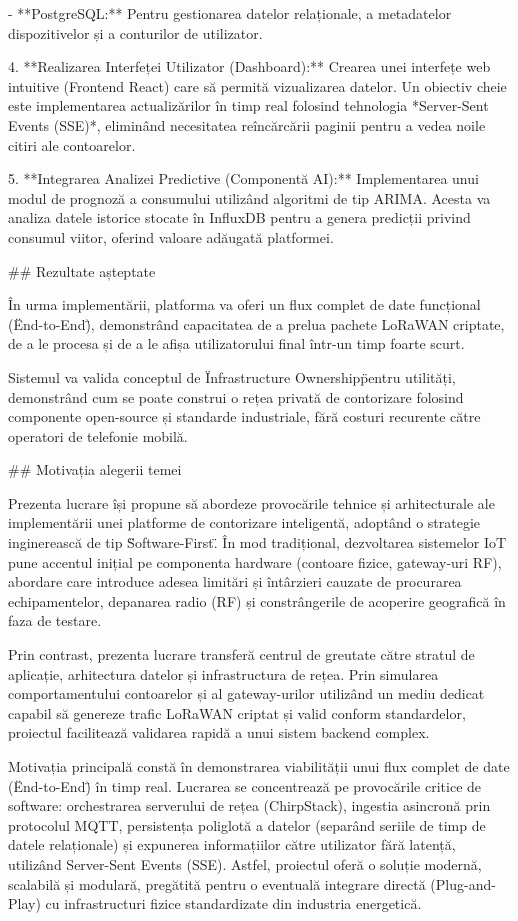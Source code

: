     - **PostgreSQL:** Pentru gestionarea datelor relaționale, a
      metadatelor dispozitivelor și a conturilor de utilizator.

4.  **Realizarea Interfeței Utilizator (Dashboard):** Crearea unei
    interfețe web intuitive (Frontend React) care să permită
    vizualizarea datelor. Un obiectiv cheie este implementarea
    actualizărilor în timp real folosind tehnologia *Server-Sent Events
    (SSE)*, eliminând necesitatea reîncărcării paginii pentru a vedea
    noile citiri ale contoarelor.

5.  **Integrarea Analizei Predictive (Componentă AI):** Implementarea
    unui modul de prognoză a consumului utilizând algoritmi de tip
    ARIMA. Acesta va analiza datele istorice stocate în InfluxDB pentru
    a genera predicții privind consumul viitor, oferind valoare adăugată
    platformei.

## Rezultate așteptate

În urma implementării, platforma va oferi un flux complet de date
funcțional (\"End-to-End\"), demonstrând capacitatea de a prelua pachete
LoRaWAN criptate, de a le procesa și de a le afișa utilizatorului final
într-un timp foarte scurt.

Sistemul va valida conceptul de \"Infrastructure Ownership\" pentru
utilități, demonstrând cum se poate construi o rețea privată de
contorizare folosind componente open-source și standarde industriale,
fără costuri recurente către operatori de telefonie mobilă.

## Motivația alegerii temei

Prezenta lucrare își propune să abordeze provocările tehnice și
arhitecturale ale implementării unei platforme de contorizare
inteligentă, adoptând o strategie inginerească de tip
\"Software-First\". În mod tradițional, dezvoltarea sistemelor IoT pune
accentul inițial pe componenta hardware (contoare fizice, gateway-uri
RF), abordare care introduce adesea limitări și întârzieri cauzate de
procurarea echipamentelor, depanarea radio (RF) și constrângerile de
acoperire geografică în faza de testare.

Prin contrast, prezenta lucrare transferă centrul de greutate către
stratul de aplicație, arhitectura datelor și infrastructura de rețea.
Prin simularea comportamentului contoarelor și al gateway-urilor
utilizând un mediu dedicat capabil să genereze trafic LoRaWAN criptat și
valid conform standardelor, proiectul facilitează validarea rapidă a
unui sistem backend complex.

Motivația principală constă în demonstrarea viabilității unui flux
complet de date (\"End-to-End\") în timp real. Lucrarea se concentrează
pe provocările critice de software: orchestrarea serverului de rețea
(ChirpStack), ingestia asincronă prin protocolul MQTT, persistența
poliglotă a datelor (separând seriile de timp de datele relaționale) și
expunerea informațiilor către utilizator fără latență, utilizând
Server-Sent Events (SSE). Astfel, proiectul oferă o soluție modernă,
scalabilă și modulară, pregătită pentru o eventuală integrare directă
(Plug-and-Play) cu infrastructuri fizice standardizate din industria
energetică.

